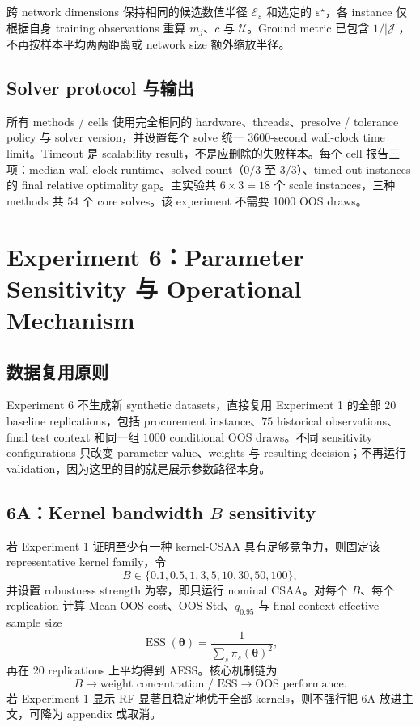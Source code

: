 \documentclass[11pt,a4paper]{ctexart}
\newcommand{\J}{\mathcal J}
\begin{document}
跨 network dimensions 保持相同的候选数值半径 $\mathcal E_{\varepsilon}$ 和选定的 $\varepsilon^\star$，各 instance 仅根据自身 training observations 重算 $m_j$、$c$ 与 $\mathcal U$。Ground metric 已包含 $1/|\J|$，不再按样本平均两两距离或 network size 额外缩放半径。

\subsection{Solver protocol 与输出}

所有 methods / cells 使用完全相同的 hardware、threads、presolve / tolerance policy 与 solver version，并设置每个 solve 统一 $3600$-second wall-clock time limit。Timeout 是 scalability result，不是应删除的失败样本。每个 cell 报告三项：median wall-clock runtime、solved count（$0/3$ 至 $3/3$）、timed-out instances 的 final relative optimality gap。主实验共 $6\times3=18$ 个 scale instances，三种 methods 共 $54$ 个 core solves。该 experiment 不需要 1000 OOS draws。

\section{Experiment 6：Parameter Sensitivity 与 Operational Mechanism}

\subsection{数据复用原则}

Experiment 6 不生成新 synthetic datasets，直接复用 Experiment 1 的全部 $20$ baseline replications，包括 procurement instance、$75$ historical observations、final test context 和同一组 $1000$ conditional OOS draws。不同 sensitivity configurations 只改变 parameter value、weights 与 resulting decision；不再运行 validation，因为这里的目的就是展示参数路径本身。

\subsection{6A：Kernel bandwidth $B$ sensitivity}

若 Experiment 1 证明至少有一种 kernel-CSAA 具有足够竞争力，则固定该 representative kernel family，令
\[
B\in\{0.1,0.5,1,3,5,10,30,50,100\},
\]
并设置 robustness strength 为零，即只运行 nominal CSAA。对每个 $B$、每个 replication 计算 Mean OOS cost、OOS Std、$q_{0.95}$ 与 final-context effective sample size
\[
\operatorname{ESS}(\boldsymbol\theta)=\frac{1}{\sum_s\pi_s(\boldsymbol\theta)^2},
\]
再在 $20$ replications 上平均得到 AESS。核心机制链为
\[
B\rightarrow\text{weight concentration / ESS}\rightarrow\text{OOS performance}.
\]
若 Experiment 1 显示 RF 显著且稳定地优于全部 kernels，则不强行把 6A 放进主文，可降为 appendix 或取消。
\end{document}
